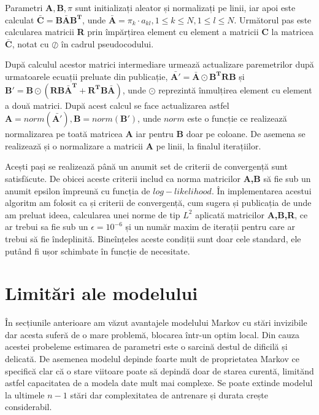 Parametri $\textbf{A},\textbf{B},\pi$ sunt initializați aleator și normalizați pe linii, iar apoi este calculat $\mathbf{\bar{C} = B\bar{A}B^{T}}$, unde $\mathbf{\bar{A}} = {\pi_{k}\cdot a_{kl}}, 1 \leq k \leq N, 1\leq l \leq N$. Următorul pas este calcularea matricii \textbf{R} prin împărțirea element cu element a matricii \textbf{C} la matricea $\mathbf{\bar{C}}$, notat cu $\oslash$ în cadrul pseudocodului.\par

După calculul acestor matrici intermediare urmează actualizare paremetrilor după urmatoarele ecuații preluate din publicație, $\mathbf{\bar{A'} = \bar{A} \odot B^{T}RB}$ și $\mathbf{B'} = \mathbf{B} \odot \mathbf{(RB\bar{A}^{T} + R^{T}B\bar{A})}$, unde $\odot$ reprezintă înmulțirea element cu element a două matrici. După acest calcul se face actualizarea astfel $\mathbf{A} = norm(\mathbf{\bar{A'}}),\mathbf{B} = norm(\mathbf{B'})$, unde $norm$ este o funcție ce realizează normalizarea pe toată matricea \textbf{A} iar pentru \textbf{B} doar pe coloane. De asemena se realizează și o normalizare a matricii \textbf{A} pe linii, la finalul iterațiilor.\par

Acești pași se realizează până un anumit set de criterii de convergență sunt satisfăcute. De obicei aceste criterii includ ca norma matricilor \textbf{A,B} să fie sub un anumit epsilon împreună cu funcția de $log-likelihood$. În implementarea acestui algoritm am folosit ca și criterii de convergență, cum sugera și publicația de unde am preluat ideea, calcularea unei norme de tip $L^{2}$ aplicată matricilor \textbf{A,B,R}, ce ar trebui sa fie sub un $\epsilon = 10^{-6}$ și un număr maxim de iterații pentru care ar trebui să fie îndeplinită. Bineînțeles aceste condiții sunt doar cele standard, ele putând fi ușor schimbate în funcție de necesitate.\par

\section{Limitări ale modelului}

În secțiunile anterioare am văzut avantajele modelului Markov cu stări invizibile dar acesta suferă de o mare problemă, blocarea într-un optim local. Din cauza acestei probeleme estimarea de parametri este o sarcină destul de dificilă și delicată. De asemenea modelul depinde foarte mult de proprietatea Markov ce specifică clar că o stare viitoare poate să depindă doar de starea curentă, limitănd astfel capacitatea de a modela date mult mai complexe. Se poate extinde modelul la ultimele $n-1$ stări dar complexitatea de antrenare și durata crește considerabil.
\par

